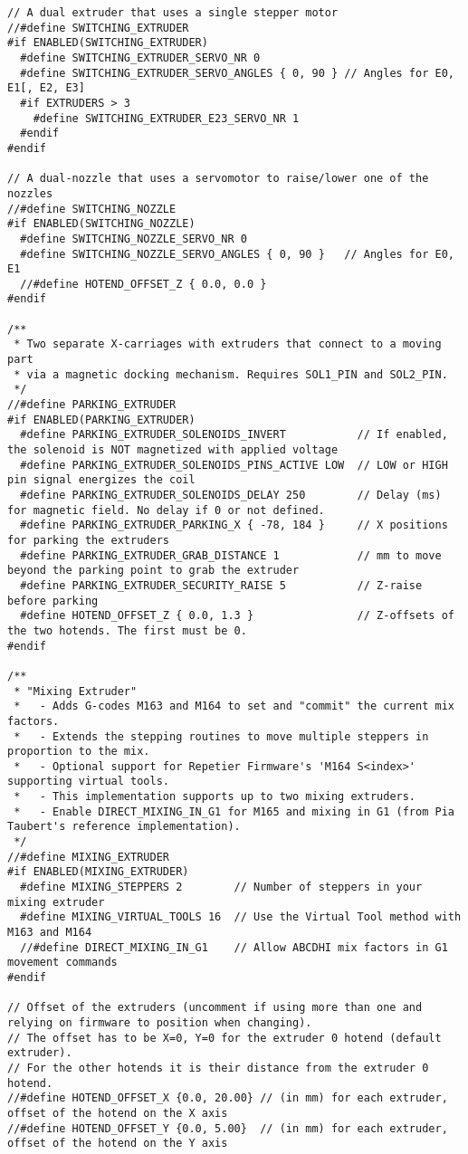 \begin{lstlisting}[caption = キャプション, label = ラベル]
// A dual extruder that uses a single stepper motor
//#define SWITCHING_EXTRUDER
#if ENABLED(SWITCHING_EXTRUDER)
  #define SWITCHING_EXTRUDER_SERVO_NR 0
  #define SWITCHING_EXTRUDER_SERVO_ANGLES { 0, 90 } // Angles for E0, E1[, E2, E3]
  #if EXTRUDERS > 3
    #define SWITCHING_EXTRUDER_E23_SERVO_NR 1
  #endif
#endif

// A dual-nozzle that uses a servomotor to raise/lower one of the nozzles
//#define SWITCHING_NOZZLE
#if ENABLED(SWITCHING_NOZZLE)
  #define SWITCHING_NOZZLE_SERVO_NR 0
  #define SWITCHING_NOZZLE_SERVO_ANGLES { 0, 90 }   // Angles for E0, E1
  //#define HOTEND_OFFSET_Z { 0.0, 0.0 }
#endif

/**
 * Two separate X-carriages with extruders that connect to a moving part
 * via a magnetic docking mechanism. Requires SOL1_PIN and SOL2_PIN.
 */
//#define PARKING_EXTRUDER
#if ENABLED(PARKING_EXTRUDER)
  #define PARKING_EXTRUDER_SOLENOIDS_INVERT           // If enabled, the solenoid is NOT magnetized with applied voltage
  #define PARKING_EXTRUDER_SOLENOIDS_PINS_ACTIVE LOW  // LOW or HIGH pin signal energizes the coil
  #define PARKING_EXTRUDER_SOLENOIDS_DELAY 250        // Delay (ms) for magnetic field. No delay if 0 or not defined.
  #define PARKING_EXTRUDER_PARKING_X { -78, 184 }     // X positions for parking the extruders
  #define PARKING_EXTRUDER_GRAB_DISTANCE 1            // mm to move beyond the parking point to grab the extruder
  #define PARKING_EXTRUDER_SECURITY_RAISE 5           // Z-raise before parking
  #define HOTEND_OFFSET_Z { 0.0, 1.3 }                // Z-offsets of the two hotends. The first must be 0.
#endif

/**
 * "Mixing Extruder"
 *   - Adds G-codes M163 and M164 to set and "commit" the current mix factors.
 *   - Extends the stepping routines to move multiple steppers in proportion to the mix.
 *   - Optional support for Repetier Firmware's 'M164 S<index>' supporting virtual tools.
 *   - This implementation supports up to two mixing extruders.
 *   - Enable DIRECT_MIXING_IN_G1 for M165 and mixing in G1 (from Pia Taubert's reference implementation).
 */
//#define MIXING_EXTRUDER
#if ENABLED(MIXING_EXTRUDER)
  #define MIXING_STEPPERS 2        // Number of steppers in your mixing extruder
  #define MIXING_VIRTUAL_TOOLS 16  // Use the Virtual Tool method with M163 and M164
  //#define DIRECT_MIXING_IN_G1    // Allow ABCDHI mix factors in G1 movement commands
#endif

// Offset of the extruders (uncomment if using more than one and relying on firmware to position when changing).
// The offset has to be X=0, Y=0 for the extruder 0 hotend (default extruder).
// For the other hotends it is their distance from the extruder 0 hotend.
//#define HOTEND_OFFSET_X {0.0, 20.00} // (in mm) for each extruder, offset of the hotend on the X axis
//#define HOTEND_OFFSET_Y {0.0, 5.00}  // (in mm) for each extruder, offset of the hotend on the Y axis


\end{lstlisting}

